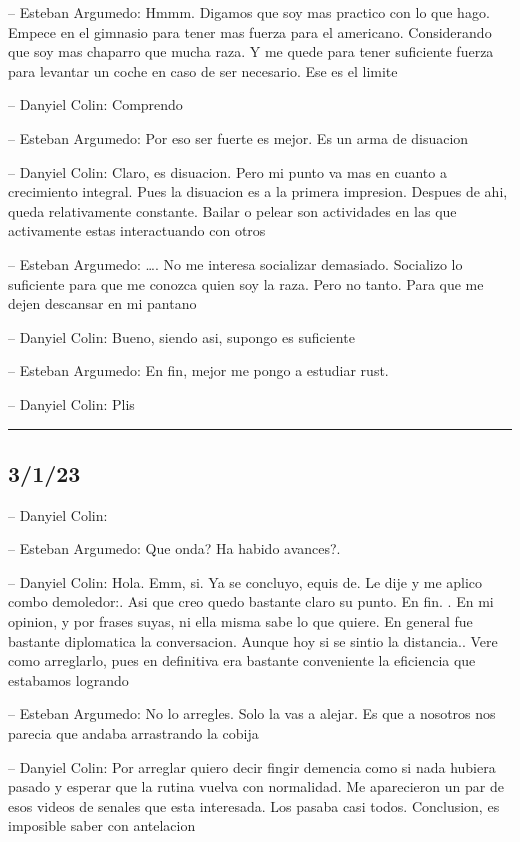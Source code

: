 -- Esteban Argumedo: Hmmm. Digamos que soy mas practico con lo que hago.
Empece en el gimnasio para tener mas fuerza para el americano.
Considerando que soy mas chaparro que mucha raza. Y me quede para tener
suficiente fuerza para levantar un coche en caso de ser necesario. Ese
es el limite

-- Danyiel Colin: Comprendo

-- Esteban Argumedo: Por eso ser fuerte es mejor. Es un arma de
disuacion

-- Danyiel Colin: Claro, es disuacion. Pero mi punto va mas en cuanto a
crecimiento integral. Pues la disuacion es a la primera impresion.
Despues de ahi, queda relativamente constante. Bailar o pelear son
actividades en las que activamente estas interactuando con otros

-- Esteban Argumedo: \ldots. No me interesa socializar demasiado.
Socializo lo suficiente para que me conozca quien soy la raza. Pero no
tanto. Para que me dejen descansar en mi pantano

-- Danyiel Colin: Bueno, siendo asi, supongo es suficiente

-- Esteban Argumedo: En fin, mejor me pongo a estudiar rust.

-- Danyiel Colin: Plis

\begin{center}\rule{0.5\linewidth}{0.5pt}\end{center}

\hypertarget{section-189}{%
\subsection{3/1/23}\label{section-189}}

-- Danyiel Colin:

-- Esteban Argumedo: Que onda? Ha habido avances?.

-- Danyiel Colin: Hola. Emm, si. Ya se concluyo, equis de. Le dije y me
aplico combo demoledor:. Asi que creo quedo bastante claro su punto. En
fin. . En mi opinion, y por frases suyas, ni ella misma sabe lo que
quiere. En general fue bastante diplomatica la conversacion. Aunque hoy
si se sintio la distancia.. Vere como arreglarlo, pues en definitiva era
bastante conveniente la eficiencia que estabamos logrando

-- Esteban Argumedo: No lo arregles. Solo la vas a alejar. Es que a
nosotros nos parecia que andaba arrastrando la cobija

-- Danyiel Colin: Por arreglar quiero decir fingir demencia como si nada
hubiera pasado y esperar que la rutina vuelva con normalidad. Me
aparecieron un par de esos videos de senales que esta interesada. Los
pasaba casi todos. Conclusion, es imposible saber con antelacion

